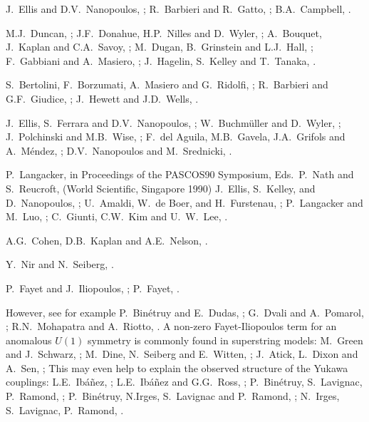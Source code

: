 \begin{thebibliography}{99}
J.~Ellis and D.V.~Nanopoulos, ;
R.~Barbieri and R.~Gatto, ;
B.A.~Campbell, .

 M.J.~Duncan, ;
J.F.~Donahue, H.P.~Nilles and D.~Wyler, ;
A.~Bouquet, J.~Kaplan and C.A.~Savoy, ;
M.~Dugan, B.~Grinstein and L.J.~Hall, ;
F.~Gabbiani and A.~Masiero, ;
J.~Hagelin, S.~Kelley and T.~Tanaka, .

S.~Bertolini, F.~Borzumati, A.~Masiero and G.~Ridolfi,
;
R.~Barbieri and G.F.~Giudice,
;
J.~Hewett and J.D.~Wells, .

J.~Ellis, S.~Ferrara and D.V.~Nanopoulos, ;
W.~Buchm\"uller and D.~Wyler, ;
J.~Polchinski and M.B.~Wise, ;
F.~del Aguila, M.B.~Gavela, J.A.~Grifols and A.~M\'endez,
;
D.V.~Nanopoulos and M.~Srednicki, .

 P.~Langacker, in Proceedings of the
PASCOS90 Symposium, Eds.~P.~Nath
and S.~Reucroft, (World Scientific, Singapore 1990)
J.~Ellis, S.~Kelley, and D.~Nanopoulos, ;
U.~Amaldi, W.~de Boer, and H.~Furstenau, ;
P.~Langacker and M.~Luo, ;
C.~Giunti, C.W.~Kim and U.~W.~Lee, .

A.G.~Cohen, D.B.~Kaplan and A.E.~Nelson,
.

Y.~Nir and N.~Seiberg, .

 P.~Fayet and J.~Iliopoulos,
; P.~Fayet, .

 However, see for example
P.~Bin\'etruy and  E.~Dudas, ;
G.~Dvali and A.~Pomarol, ;
R.N.~Mohapatra and A.~Riotto, .
A non-zero Fayet-Iliopoulos term for an anomalous $U(1)$ symmetry
is commonly found in superstring models:
M.~Green and J.~Schwarz, ;
M.~Dine, N.~Seiberg and E.~Witten, ;
J.~Atick, L.~Dixon and A.~Sen, ;
This may even help to explain the
observed structure of the Yukawa couplings:
L.E.~Ib\'a\~nez, ;
L.E.~Ib\'a\~nez and G.G.~Ross,
;
P.~Bin\'etruy, S.~Lavignac, P.~Ramond,
;
P.~Bin\'etruy, N.Irges, S.~Lavignac and P.~Ramond,
;
N.~Irges, S.~Lavignac, P.~Ramond,
.


\end{thebibliography}
